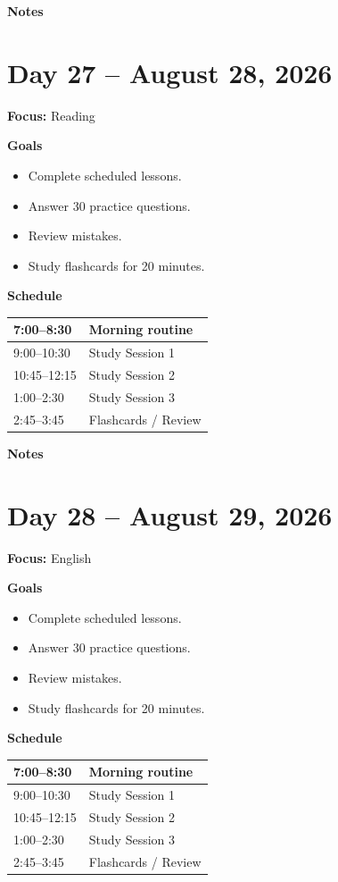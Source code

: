 \vspace{1em}
\textbf{Notes}

\vspace{8cm}

\newpage

\section*{Day 27 -- August 28, 2026}
\textbf{Focus:} Reading

\textbf{Goals}
\begin{itemize}
\item Complete scheduled lessons.
\item Answer 30 practice questions.
\item Review mistakes.
\item Study flashcards for 20 minutes.
\end{itemize}

\textbf{Schedule}
\begin{tabular}{|p{4cm}|p{10cm}|}\hline
7:00--8:30 & Morning routine \\\hline
9:00--10:30 & Study Session 1 \\\hline
10:45--12:15 & Study Session 2 \\\hline
1:00--2:30 & Study Session 3 \\\hline
2:45--3:45 & Flashcards / Review \\\hline
\end{tabular}

\vspace{1em}
\textbf{Notes}

\vspace{8cm}

\newpage

\section*{Day 28 -- August 29, 2026}
\textbf{Focus:} English

\textbf{Goals}
\begin{itemize}
\item Complete scheduled lessons.
\item Answer 30 practice questions.
\item Review mistakes.
\item Study flashcards for 20 minutes.
\end{itemize}

\textbf{Schedule}
\begin{tabular}{|p{4cm}|p{10cm}|}\hline
7:00--8:30 & Morning routine \\\hline
9:00--10:30 & Study Session 1 \\\hline
10:45--12:15 & Study Session 2 \\\hline
1:00--2:30 & Study Session 3 \\\hline
2:45--3:45 & Flashcards / Review \\\hline
\end{tabular}

